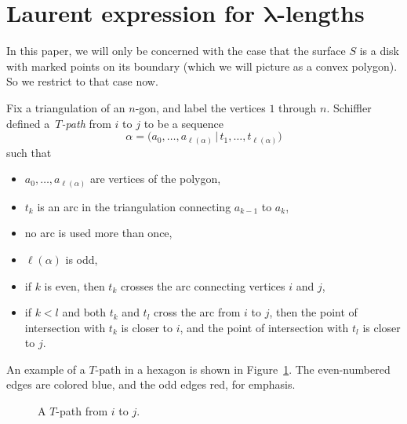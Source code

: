 \documentclass[11pt]{article}
\numberwithin{equation}{section}
\numberwithin{equation}{section}
\begin{document}
\section[Laurent expression for lambda-lengths]{Laurent expression for $\boldsymbol{\lambda}$-lengths}

In this paper, we will only be concerned with the case that the surface $S$ is a disk with marked points on its boundary (which we will
picture as a convex polygon). So we restrict to that case now.

Fix a triangulation of an $n$-gon, and label the vertices $1$ through $n$.
Schiffler~\cite{schiffler_08} defined a~\emph{$T$-path} from $i$ to $j$ to be a sequence
\[ \alpha = \big(a_0,\dots,a_{\ell(\alpha)} \,|\, t_1,\dots,t_{\ell(\alpha)}\big) \]
such that
\begin{itemize}\itemsep=0pt
 \item[(T1)] $a_0,\dots,a_{\ell(\alpha)}$ are vertices of the polygon,
 \item[(T2)] $t_k$ is an arc in the triangulation connecting $a_{k-1}$ to $a_k$,
 \item[(T3)] no arc is used more than once,
 \item[(T4)] $\ell(\alpha)$ is odd,
 \item[(T5)] if $k$ is even, then $t_k$ crosses the arc connecting vertices $i$ and $j$,
 \item[(T6)] if $k < l$ and both $t_k$ and $t_l$ cross the arc from $i$ to $j$, then
 the point of intersection with $t_k$ is closer to $i$, and the point of intersection
 with $t_l$ is closer to $j$.
\end{itemize}

An example of a $T$-path in a hexagon is shown in Figure~\ref{fig:t_path}.
The even-numbered edges are colored blue, and the odd edges red, for emphasis.

\begin{figure}[h!] \centering


 \caption{A $T$-path from $i$ to $j$.} \label {fig:t_path}
\end{figure}
\end{document}
